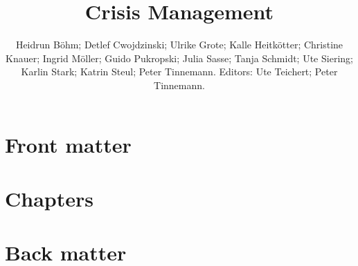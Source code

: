 \documentclass[11pt]{book}
\title{Crisis Management}
\author{Heidrun Böhm; Detlef Cwojdzinski; Ulrike Grote; Kalle Heitkötter; Christine Knauer; Ingrid Möller; Guido Pukropski; Julia Sasse; Tanja Schmidt; Ute Siering; Karlin Stark; Katrin Steul; Peter Tinnemann. Editors: Ute Teichert; Peter Tinnemann.}
\begin{document}
\maketitle
\def\title#1{\chapter{#1}}
\tableofcontents

\part{Front matter}
        
        
\part{Chapters}
        
        
        
        
        
        
        
        
        
        
        
        
        
        
\part{Back matter}
        
        
        
        
        
        
        
        
        
        
        
        
        
        
        
        
        
        
        
        
\end{document}
